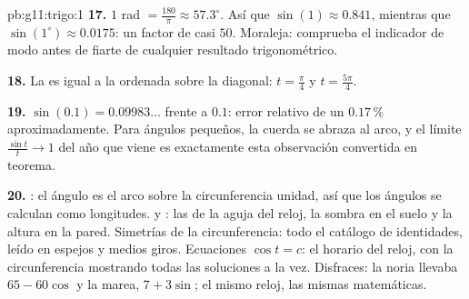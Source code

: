 \begin{solution}{pb:g11:trigo:1}
\textbf{17.} $1$ rad $= \frac{180}{\pi} \approx 57.3^\circ$. Así que
$\sin(1) \approx 0.841$, mientras que $\sin(1^\circ) \approx 0.0175$: un
factor de casi $50$. Moraleja: comprueba el indicador de modo antes de
fiarte de cualquier resultado trigonométrico.

\textbf{18.} La  es igual a la ordenada sobre la diagonal:
$t = \frac\pi4$ y $t = \frac{5\pi}{4}$.

\textbf{19.} $\sin(0.1) = 0.09983\ldots$ frente a $0.1$: error relativo de
un $0.17\,\%$ aproximadamente. Para ángulos pequeños, la cuerda se abraza
al arco, y el límite $\frac{\sin t}{t} \to 1$ del año que viene es
exactamente esta observación convertida en teorema.

\textbf{20.} : el ángulo es el arco sobre la circunferencia
unidad, así que los ángulos se calculan como longitudes.  y :
las  de la aguja del reloj, la sombra en el suelo y la altura
en la pared. Simetrías de la circunferencia: todo el catálogo de
identidades, leído en espejos y medios giros. Ecuaciones $\cos t = c$: el
horario del reloj, con la circunferencia mostrando todas las soluciones a
la vez. Disfraces: la noria llevaba $65 - 60\cos$ y la marea, $7 + 3\sin$;
el mismo reloj, las mismas matemáticas.
\end{solution}
